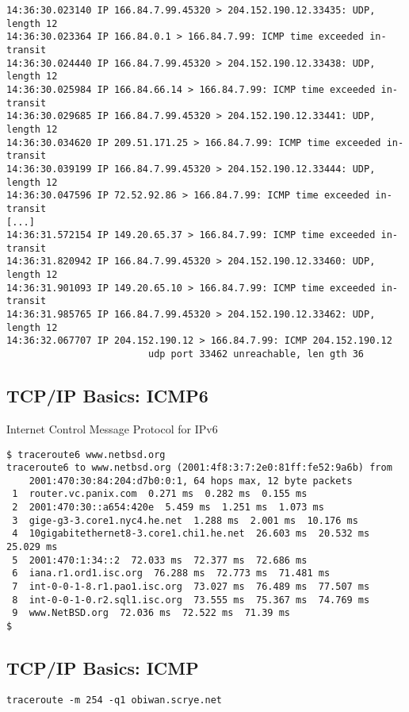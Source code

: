 \documentclass[xga]{xdvislides}
\begin{document}
\begin{verbatim}
14:36:30.023140 IP 166.84.7.99.45320 > 204.152.190.12.33435: UDP, length 12
14:36:30.023364 IP 166.84.0.1 > 166.84.7.99: ICMP time exceeded in-transit
14:36:30.024440 IP 166.84.7.99.45320 > 204.152.190.12.33438: UDP, length 12
14:36:30.025984 IP 166.84.66.14 > 166.84.7.99: ICMP time exceeded in-transit
14:36:30.029685 IP 166.84.7.99.45320 > 204.152.190.12.33441: UDP, length 12
14:36:30.034620 IP 209.51.171.25 > 166.84.7.99: ICMP time exceeded in-transit
14:36:30.039199 IP 166.84.7.99.45320 > 204.152.190.12.33444: UDP, length 12
14:36:30.047596 IP 72.52.92.86 > 166.84.7.99: ICMP time exceeded in-transit
[...]
14:36:31.572154 IP 149.20.65.37 > 166.84.7.99: ICMP time exceeded in-transit
14:36:31.820942 IP 166.84.7.99.45320 > 204.152.190.12.33460: UDP, length 12
14:36:31.901093 IP 149.20.65.10 > 166.84.7.99: ICMP time exceeded in-transit
14:36:31.985765 IP 166.84.7.99.45320 > 204.152.190.12.33462: UDP, length 12
14:36:32.067707 IP 204.152.190.12 > 166.84.7.99: ICMP 204.152.190.12
                         udp port 33462 unreachable, len gth 36
\end{verbatim}


\subsection{TCP/IP Basics: ICMP6}
\begin{center}
Internet Control Message Protocol for IPv6
\end{center}
\vspace{.2in}

\begin{verbatim}
$ traceroute6 www.netbsd.org
traceroute6 to www.netbsd.org (2001:4f8:3:7:2e0:81ff:fe52:9a6b) from
    2001:470:30:84:204:d7b0:0:1, 64 hops max, 12 byte packets
 1  router.vc.panix.com  0.271 ms  0.282 ms  0.155 ms
 2  2001:470:30::a654:420e  5.459 ms  1.251 ms  1.073 ms
 3  gige-g3-3.core1.nyc4.he.net  1.288 ms  2.001 ms  10.176 ms
 4  10gigabitethernet8-3.core1.chi1.he.net  26.603 ms  20.532 ms  25.029 ms
 5  2001:470:1:34::2  72.033 ms  72.377 ms  72.686 ms
 6  iana.r1.ord1.isc.org  76.288 ms  72.773 ms  71.481 ms
 7  int-0-0-1-8.r1.pao1.isc.org  73.027 ms  76.489 ms  77.507 ms
 8  int-0-0-1-0.r2.sql1.isc.org  73.555 ms  75.367 ms  74.769 ms
 9  www.NetBSD.org  72.036 ms  72.522 ms  71.39 ms
$
\end{verbatim}

\subsection{TCP/IP Basics: ICMP}
\vfill
\verb+traceroute -m 254 -q1 obiwan.scrye.net+
\vfill
\end{document}
